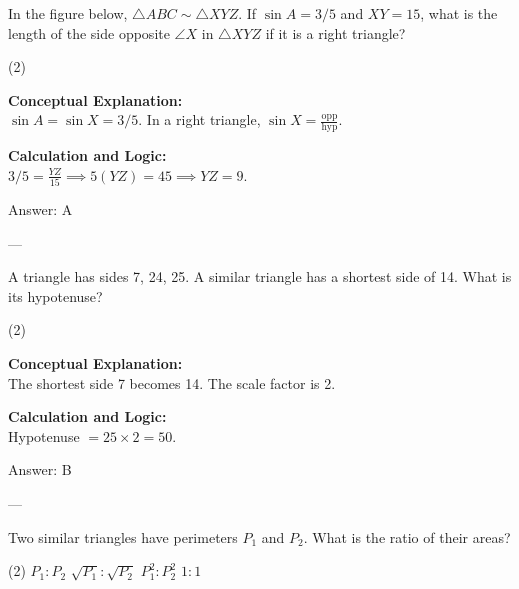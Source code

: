 \documentclass[11pt,paper=a4,answers]{exam}
\begin{document}
\begin{questions}
\question
In the figure below, $\triangle ABC \sim \triangle XYZ$. If $\sin A = 3/5$ and $XY = 15$, what is the length of the side opposite $\angle X$ in $\triangle XYZ$ if it is a right triangle?
\begin{tasks}(2)
\end{tasks}

\begin{solution}
\textbf{Conceptual Explanation:} \\
$\sin A = \sin X = 3/5$. In a right triangle, $\sin X = \frac{\text{opp}}{\text{hyp}}$.

\vspace{10pt}
\textbf{Calculation and Logic:} \\
$3/5 = \frac{YZ}{15} \implies 5(YZ) = 45 \implies YZ = 9$.

\vspace{15pt}
Answer: \colorbox{yellow!100}{A}
\end{solution}

---

\question
A triangle has sides 7, 24, 25. A similar triangle has a shortest side of 14. What is its hypotenuse?
\begin{tasks}(2)
\end{tasks}

\begin{solution}
\textbf{Conceptual Explanation:} \\
The shortest side 7 becomes 14. The scale factor is 2.

\vspace{10pt}
\textbf{Calculation and Logic:} \\
Hypotenuse $= 25 \times 2 = 50$.

\vspace{15pt}
Answer: \colorbox{yellow!100}{B}
\end{solution}

---

\question
Two similar triangles have perimeters $P_1$ and $P_2$. What is the ratio of their areas?
\begin{tasks}(2)
    \task $P_1 : P_2$
    \task $\sqrt{P_1} : \sqrt{P_2}$
    \task $P_1^2 : P_2^2$
    \task $1 : 1$
\end{tasks}


\end{questions}
\end{document}
